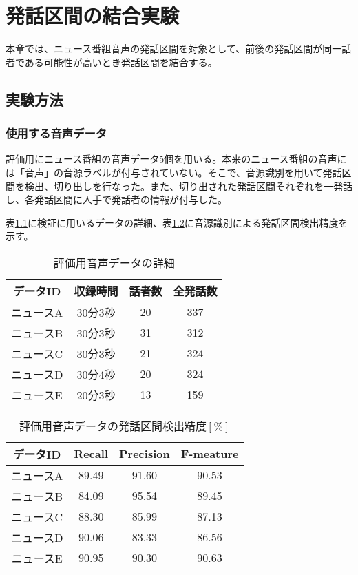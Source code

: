 \chapter{発話区間の結合実験}
本章では、ニュース番組音声の発話区間を対象として、前後の発話区間が同一話者である可能性が高いとき発話区間を結合する。
\section{実験方法}
\subsection{使用する音声データ}
\par
評価用にニュース番組の音声データ5個を用いる。本来のニュース番組の音声には「音声」の音源ラベルが付与されていない。そこで、音源識別を用いて発話区間を検出、切り出しを行なった。また、切り出された発話区間それぞれを一発話し、各発話区間に人手で発話者の情報が付与した。\par
表\ref{table:test_detail}に検証に用いるデータの詳細、表\ref{table:test_detail_RPF}に音源識別による発話区間検出精度を示す。

\begin{table}[htb]
  \begin{center}
    \caption{評価用音声データの詳細 \label{table:test_detail}}
    \begin{tabular}{|c||c|c|c|} \hline
      データID & 収録時間 & 話者数 & 全発話数 \\ \hline
      ニュースA & 30分3秒 & 20 & 337 \\ \hline
      ニュースB & 30分3秒 & 31 & 312\\ \hline
      ニュースC & 30分3秒 & 21 & 324 \\ \hline
      ニュースD & 30分4秒 & 20 & 324\\ \hline
      ニュースE & 20分3秒 & 13 & 159\\ \hline
    \end{tabular}
  \end{center}
\end{table}

\begin{table}[htb]
  \begin{center}
    \caption{評価用音声データの発話区間検出精度$[\%]$ \label{table:test_detail_RPF}}
    \begin{tabular}{|c||c|c|c|} \hline
      データID & Recall & Precision & F-meature \\ \hline
      ニュースA & 89.49 & 91.60 & 90.53 \\ \hline
      ニュースB & 84.09 & 95.54 & 89.45\\ \hline
      ニュースC & 88.30 & 85.99 & 87.13 \\ \hline
      ニュースD & 90.06 & 83.33 & 86.56\\ \hline
      ニュースE & 90.95 & 90.30 & 90.63\\ \hline
    \end{tabular}
  \end{center}
\end{table}


